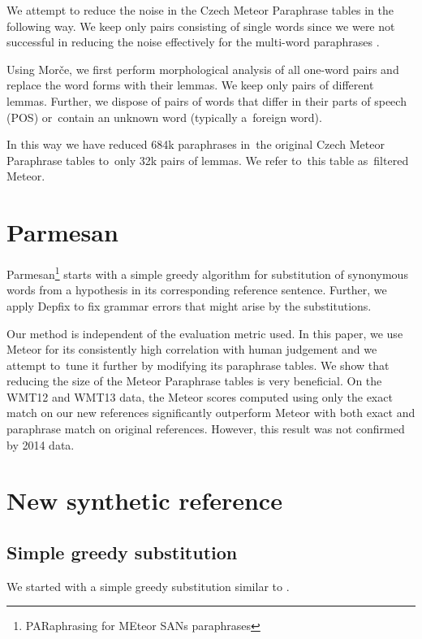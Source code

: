 \documentclass[11pt]{article}
\begin{document}
We attempt to reduce the noise in the Czech Meteor Paraphrase tables in the following way. We 
keep only pairs consisting of single words since we were not successful in reducing the noise
effectively for the multi-word paraphrases \cite{barancikova2014}. 

Using Morče, we first perform morphological analysis of all one-word pairs and replace 
the word forms with their lemmas.  We keep only pairs of different lemmas. Further, we
 dispose of pairs of words that differ in their parts of speech (POS) or~contain an 
unknown word (typically a~foreign word). 

In this way we have reduced 684k paraphrases in~the original Czech Meteor Paraphrase tables 
to~only 32k pairs of lemmas. We refer to~this table as~filtered Meteor.


\section{Parmesan}


Parmesan\footnote{PARaphrasing for MEteor SANs paraphrases} starts with a simple greedy algorithm for 
substitution of synonymous words from a hypothesis in its corresponding reference sentence. Further, 
we apply Depfix \cite{depfix} to fix grammar errors that might arise by the substitutions.

Our method is independent of the evaluation metric used. In this paper, we use Meteor for its consistently 
high correlation with human judgement and we attempt to~tune it further by modifying its paraphrase tables. 
We show that reducing the size of the Meteor Paraphrase tables is very beneficial. On the WMT12 and WMT13 data,
the Meteor scores computed using only the exact match on our new references significantly outperform Meteor 
with both exact and paraphrase match on original references. However, this result was not confirmed by 2014 
data. %




\section{New synthetic reference}

\subsection{Simple greedy substitution}
We started with a simple greedy substitution similar to \cite{kauchak}.
 
\end{document}
